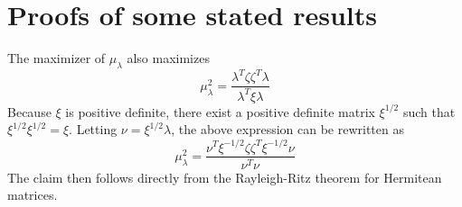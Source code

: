 \documentclass[final]{IEEEtran}
\theoremstyle{definition}
\begin{document}
\section{Proofs of some stated results}
\label{sec:proofs-some-stated}
\begin{IEEEproof}
  The maximizer of $\mu_\lambda$ also maximizes
  \begin{equation*}
    \mu_{\lambda}^{2} = \frac{\lambda^{T} \zeta \zeta^{T}
      \lambda}{\lambda^{T} \xi \lambda}
  \end{equation*}
  Because $\xi$ is positive definite, there exist a positive definite matrix
  $\xi^{1/2}$ such that $\xi^{1/2} \xi^{1/2} = \xi$. Letting $\nu = \xi^{1/2}
  \lambda$, the above expression can be rewritten as
  \begin{equation*}
    \mu_{\lambda}^{2} = \frac{\nu^{T} \xi^{-1/2} \zeta \zeta^{T}
      \xi^{-1/2} \nu}{ \nu^{T} \nu}
  \end{equation*}
  The claim then follows directly from the Rayleigh-Ritz theorem for
  Hermitean matrices.
\end{IEEEproof}
\begin{IEEEproof}
\end{IEEEproof}
\end{document}
